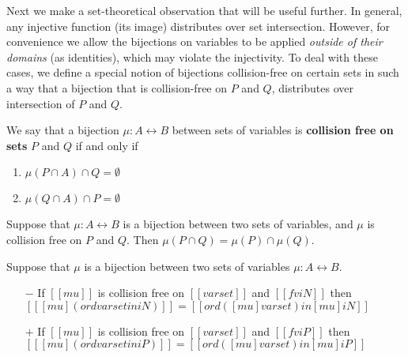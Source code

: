 Next we make a set-theoretical observation
that will be useful further.
In general, any injective function (its image)
distributes over set intersection.
However, for convenience we allow the bijections
on variables to be applied
\emph{outside of their domains}
(as identities), which may violate
the injectivity. To deal with these cases, 
we define a special notion of
bijections collision-free on certain sets
in such a way that
a bijection that is collision-free on $P$ and $Q$,
distributes over intersection of $P$ and $Q$.

\begin{definition} 
  We say that a bijection $\mu : A \leftrightarrow B$ between sets of
  variables is \textbf{collision free on sets} $P$ and $Q$ if and only if
  \begin{enumerate}
    \item $\mu(P \cap A) \cap Q = \emptyset$
    \item $\mu(Q \cap A) \cap P = \emptyset$
  \end{enumerate}
\end{definition}

\begin{observation}
  Suppose that $\mu : A \leftrightarrow B$ is a bijection between two sets of variables,
  and $\mu$ is collision free on $P$ and $Q$.
  Then $\mu(P \cap Q) = \mu(P) \cap \mu(Q)$.
\end{observation}
  

\begin{lemma}
  \label{lemma:distr-mu-ord}
  Suppose that $\mu$ is a bijection between two sets of variables
  $\mu : A \leftrightarrow B$.
  
  \begin{itemize}
  \item[$-$]
    If $[[mu]]$ is collision free on $[[varset]]$ and $[[fv iN]]$ then
    $[[ [mu] (ord varset in iN) ]] = [[ord ([mu] varset) in [mu] iN ]]$
  \item[$+$]
    If $[[mu]]$ is collision free on $[[varset]]$ and $[[fv iP]]$ then
    $[[ [mu] (ord varset in iP) ]] = [[ord ([mu] varset) in [mu] iP ]]$
  \end{itemize}
\end{lemma}

